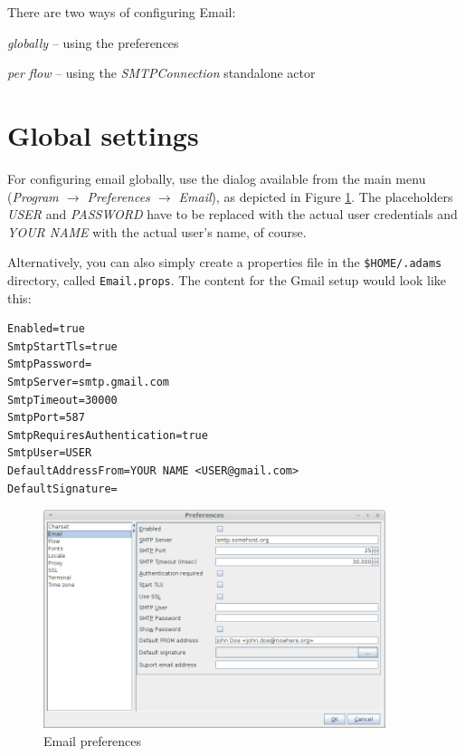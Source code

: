 \documentclass[a4paper]{book}
\begin{document}
There are two ways of configuring Email:
\begin{tight_itemize}
	\item \textit{globally} -- using the preferences
	\item \textit{per flow} -- using the \textit{SMTPConnection} standalone actor
\end{tight_itemize}

\section{Global settings}
For configuring email globally, use the dialog available from the main
menu (\textit{Program $\rightarrow$ Preferences $\rightarrow$ Email}), as depicted in Figure
\ref{email_setup}. The placeholders \textit{USER} and \textit{PASSWORD} have to
be replaced with the actual user credentials and \textit{YOUR NAME} with the
actual user's name, of course.

Alternatively, you can also simply create a properties file in the
\texttt{\$HOME/.adams} directory, called \texttt{Email.props}. The content for
the Gmail setup would look like this:

\begin{verbatim}
Enabled=true
SmtpStartTls=true
SmtpPassword=
SmtpServer=smtp.gmail.com
SmtpTimeout=30000
SmtpPort=587
SmtpRequiresAuthentication=true
SmtpUser=USER
DefaultAddressFrom=YOUR NAME <USER@gmail.com>
DefaultSignature=
\end{verbatim}

\begin{figure}[htb]
  \centering
  \includegraphics[width=10.0cm]{images/email_setup.png}
  \caption{Email preferences}
  \label{email_setup}
\end{figure}
\end{document}
